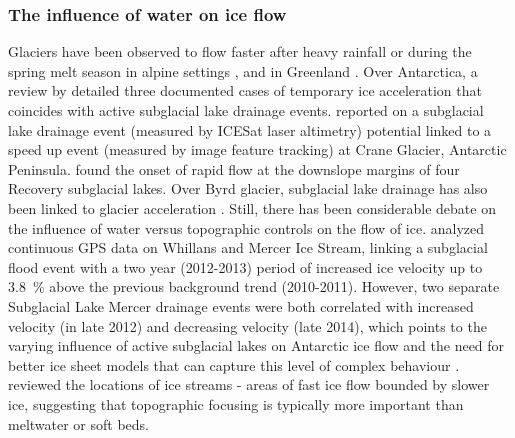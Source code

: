 \subsubsection{The influence of water on ice flow} \label{sec:influenceofwateroniceflow}

Glaciers have been observed to flow faster after heavy rainfall or during the spring melt season in alpine settings \citep[e.g.][]{IkenUpliftUnteraargletscherBeginning1983}, and in Greenland \citep{ZwallySurfaceMeltInducedAcceleration2002}.
Over Antarctica, a review by \citet{Frickerdecadeprogressobserving2016} detailed three documented cases of temporary ice acceleration that coincides with active subglacial lake drainage events.
\citet{Scambostriggeringsubglaciallake2011} reported on a subglacial lake drainage event (measured by ICESat laser altimetry) potential linked to a speed up event (measured by image feature tracking) at Crane Glacier, Antarctic Peninsula.
\citet{BellLargesubglaciallakes2007} found the onset of rapid flow at the downslope margins of four Recovery subglacial lakes.
Over Byrd glacier, subglacial lake drainage has also been linked to glacier acceleration \citep{StearnsIncreasedflowspeed2008,WrightSubglacialhydrologicalconnectivity2014}.
Still, there has been considerable debate on the influence of water versus topographic controls on the flow of ice.
\citet{SiegfriedEpisodicicevelocity2016} analyzed continuous GPS data on Whillans and Mercer Ice Stream, linking a subglacial flood event with a two year (2012-2013) period of increased ice velocity up to \SI{3.8}{\percent} above the previous background trend (2010-2011).
However, two separate Subglacial Lake Mercer drainage events were both correlated with increased velocity (in late 2012) and decreasing velocity (late 2014), which points to the varying influence of active subglacial lakes on Antarctic ice flow and the need for better ice sheet models that can capture this level of complex behaviour \citep{SiegfriedEpisodicicevelocity2016}.
\citet{WinsborrowWhatcontrolslocation2010} reviewed the locations of ice streams - areas of fast ice flow bounded by slower ice, suggesting that topographic focusing is typically more important than meltwater or soft beds.
